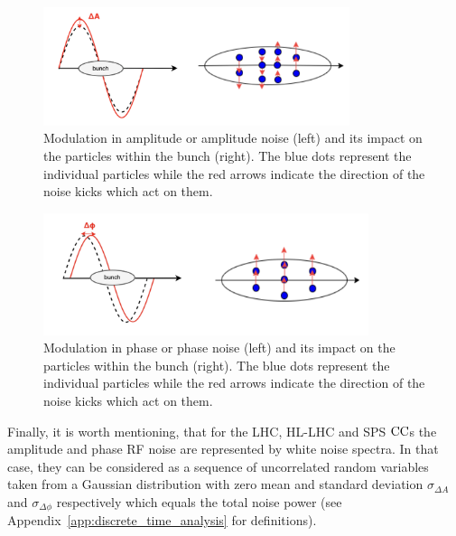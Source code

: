 \begin{figure}[!h] %
    \centering         
    \includegraphics[width=0.8\textwidth]{images/Ch3/amplitude_noise.png}
        \caption{Modulation in amplitude or amplitude noise (left) and its impact on the particles within the bunch (right). The blue dots represent the individual particles while the red arrows indicate the direction of the noise kicks which act on them.}
        \label{fig:amplitude_noise}
 \end{figure}

 \begin{figure}[!h] %
    \centering         
    \includegraphics[width=0.85\textwidth]{images/Ch3/phase_noise.png}
        \caption{Modulation in phase or phase noise (left) and its impact on the particles within the bunch (right). The blue dots represent the individual particles while the red arrows indicate the direction of the noise kicks which act on them.}
        \label{fig:phase_noise}
 \end{figure}

 Finally, it is worth mentioning, that for the LHC, HL-LHC and SPS ${\mathrm{CC}}$s the amplitude and phase RF noise are represented by white noise spectra. In that case, they can be considered as a sequence of uncorrelated random variables taken from a Gaussian distribution with zero mean and standard deviation $\sigma_{\Delta A}$ and  $\sigma_{\Delta \phi}$ respectively which equals the total noise power (see Appendix~\ref{app:discrete_time_analysis} for definitions). %

